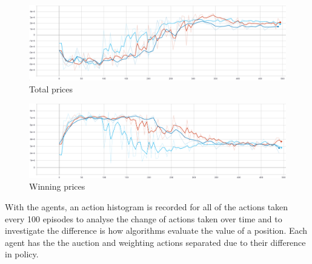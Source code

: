 \begin{figure}[H]
    \centering
    \includegraphics[width=17cm]{figures/4_test_eval_figs/algo_training_fig/total_prices.png}
    \caption{Total prices}
    \label{fig:algo_total_prices}
\end{figure}

\begin{figure}[H]
    \centering
    \includegraphics[width=17cm]{figures/4_test_eval_figs/algo_training_fig/total_winning_prices.PNG}
    \caption{Winning prices}
    \label{fig:algo_winning_prices}
\end{figure}

With the agents, an action histogram is recorded for all of the actions taken every 100 episodes to analyse the change
of actions taken over time and to investigate the difference is how algorithms evaluate the value of a position. Each
agent has the the auction and weighting actions separated due to their difference in policy. \newline

